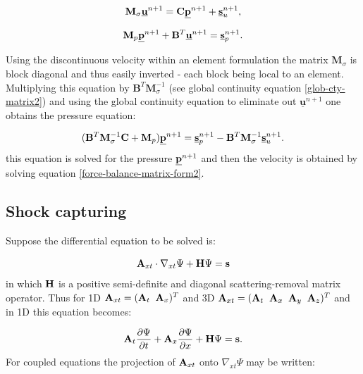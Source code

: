 \begin{equation}
{\mathbf M}_\sigma  \underline{\bf u}^{n+1} = {\mathbf C} \underline{\bf p}^{n+1} + \underline{\bf s}_u^{n+1},
\label{force-balance-matrix-form2}
\end{equation}

\begin{equation}
{\mathbf M}_p \underline{\bf p}^{n+1} + {\mathbf B}^T \underline{\bf u}^{n+1} = \underline{\bf s}_p^{n+1}. 
\label{glob-cty-matrix2}
\end{equation}

Using the discontinuous velocity within an element 
formulation the matrix ${\mathbf M}_\sigma$ is block diagonal 
and thus easily inverted - each block being local to an element.  
Multiplying this equation by ${\mathbf B}^T {\mathbf M}_\sigma^{-1}$ 
(see global continuity 
equation \ref{glob-cty-matrix2}) and using the global continuity 
equation to eliminate out $ \underline{\mathbf u}^{n+1} $ one obtains 
the pressure equation:

\begin{equation}
({\mathbf B}^T {\mathbf M}_\sigma^{-1} {\mathbf C} + {\mathbf M}_p) \underline{\bf p}^{n+1} 
=  \underline{\bf s}_p^{n+1}
- {\mathbf B}^T {\mathbf M}_\sigma^{-1}\underline{\bf s}_u^{n+1}.
\end{equation}
this equation is solved for the pressure  $\underline{\bf p}^{n+1}$ and then 
the  
velocity is obtained by solving 
equation \ref{force-balance-matrix-form2}. 


		
\subsection{Shock capturing}
\label{shock} 		

Suppose the differential equation to be solved is:  

\begin{equation}
{\bf A}_{xt} \cdot {\nabla_{xt}} \Psi 
+ {\bf H} \Psi ={\bf s} 
\label{differential-eqn-def-matrix-compact} 
\end{equation}
in which ${\bf H}$ is a positive semi-definite and diagonal 
scattering-removal matrix operator. 
Thus for 1D ${\bf A}_{xt}=({\bf A}_t \;\; {\bf A}_x)^T$ and 3D 
${\bf A}_{xt}=({\bf A}_t \;\; {\bf A}_x\;\; {\bf A}_y\;\; {\bf A}_z)^T$ and in 
1D this equation becomes: 

\begin{equation}
 {\bf A}_t \frac{\partial \Psi}{\partial t} +
{\bf A}_x \frac{\partial \Psi}{\partial x}  
+ {\bf H} \Psi ={\bf s}.
\label{differential-eqn-def-matrix} 
\end{equation}
For coupled equations 
the projection of ${\bf A}_{xt}$ onto ${\nabla_{xt}} \Psi$ may be written: 
 
